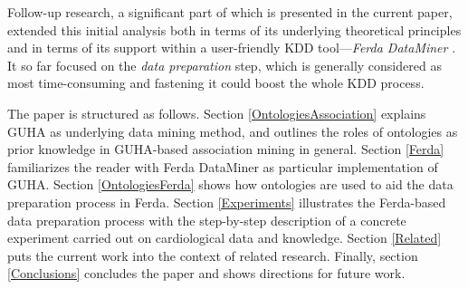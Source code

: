 Follow-up research, a significant part of which is presented in the current paper, extended this initial analysis both in terms of its underlying theoretical principles \cite{Ralbovsky} and in terms of its support within a user-friendly KDD tool---\emph{Ferda DataMiner} \cite{Zeman}.
It so far focused on the \emph{data preparation} step, which is generally considered as most time-consuming and fastening it could boost the whole KDD process. 



The paper is structured as follows. 
Section \ref{OntologiesAssociation} explains GUHA as underlying data mining method, and outlines the roles of ontologies as prior knowledge in GUHA-based association mining in general. 
Section \ref{Ferda} familiarizes the reader with Ferda DataMiner as particular implementation of GUHA. 
Section \ref{OntologiesFerda} shows how ontologies are used to aid the data preparation process in Ferda. 
Section \ref{Experiments} illustrates the Ferda-based data preparation process with the step-by-step description of a concrete experiment carried out on cardiological data and knowledge. 
Section \ref{Related} puts the current work into the context of related research. 
Finally, section \ref{Conclusions} concludes the paper and shows directions for future work. 